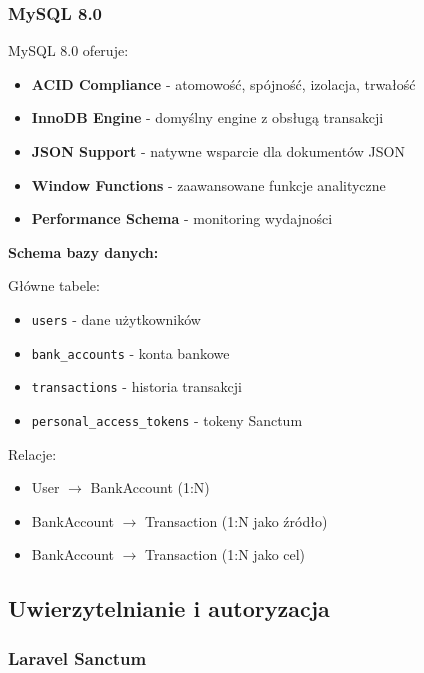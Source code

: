 \documentclass[12pt,a4paper]{article}
\begin{document}
    \subsubsection{MySQL 8.0}

    MySQL 8.0 oferuje:

    \begin{itemize}
        \item \textbf{ACID Compliance} - atomowość, spójność, izolacja, trwałość
        \item \textbf{InnoDB Engine} - domyślny engine z obsługą transakcji
        \item \textbf{JSON Support} - natywne wsparcie dla dokumentów JSON
        \item \textbf{Window Functions} - zaawansowane funkcje analityczne
        \item \textbf{Performance Schema} - monitoring wydajności
    \end{itemize}

    \textbf{Schema bazy danych:}

    Główne tabele:
    \begin{itemize}
        \item \texttt{users} - dane użytkowników
        \item \texttt{bank\_accounts} - konta bankowe
        \item \texttt{transactions} - historia transakcji
        \item \texttt{personal\_access\_tokens} - tokeny Sanctum
    \end{itemize}

    Relacje:
    \begin{itemize}
        \item User $\rightarrow$ BankAccount (1:N)
        \item BankAccount $\rightarrow$ Transaction (1:N jako źródło)
        \item BankAccount $\rightarrow$ Transaction (1:N jako cel)
    \end{itemize}

    \subsection{Uwierzytelnianie i autoryzacja}

    \subsubsection{Laravel Sanctum}
\end{document}

